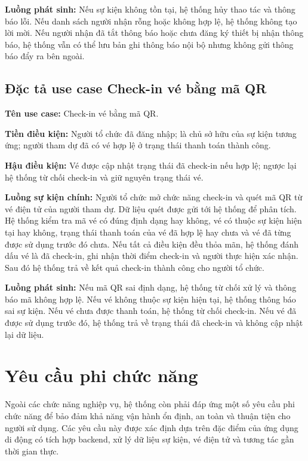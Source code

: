 \documentclass[../DoAn.tex]{subfiles}
\begin{document}
\textbf{Luồng phát sinh:}
Nếu sự kiện không tồn tại, hệ thống hủy thao tác và thông báo lỗi. Nếu danh sách người nhận rỗng hoặc không hợp lệ, hệ thống không tạo lời mời. Nếu người nhận đã tắt thông báo hoặc chưa đăng ký thiết bị nhận thông báo, hệ thống vẫn có thể lưu bản ghi thông báo nội bộ nhưng không gửi thông báo đẩy ra bên ngoài.

\subsection{Đặc tả use case Check-in vé bằng mã QR}
\textbf{Tên use case:} Check-in vé bằng mã \gls{QR}.

\textbf{Tiền điều kiện:} Người tổ chức đã đăng nhập; là chủ sở hữu của sự kiện tương ứng; người tham dự đã có vé hợp lệ ở trạng thái thanh toán thành công.

\textbf{Hậu điều kiện:} Vé được cập nhật trạng thái đã check-in nếu hợp lệ; ngược lại hệ thống từ chối check-in và giữ nguyên trạng thái vé.

\textbf{Luồng sự kiện chính:}
Người tổ chức mở chức năng check-in và quét mã \gls{QR} từ vé điện tử của người tham dự. Dữ liệu quét được gửi tới hệ thống để phân tích. Hệ thống kiểm tra mã vé có đúng định dạng hay không, vé có thuộc sự kiện hiện tại hay không, trạng thái thanh toán của vé đã hợp lệ hay chưa và vé đã từng được sử dụng trước đó chưa. Nếu tất cả điều kiện đều thỏa mãn, hệ thống đánh dấu vé là đã check-in, ghi nhận thời điểm check-in và người thực hiện xác nhận. Sau đó hệ thống trả về kết quả check-in thành công cho người tổ chức.

\textbf{Luồng phát sinh:}
Nếu mã \gls{QR} sai định dạng, hệ thống từ chối xử lý và thông báo mã không hợp lệ. Nếu vé không thuộc sự kiện hiện tại, hệ thống thông báo sai sự kiện. Nếu vé chưa được thanh toán, hệ thống từ chối check-in. Nếu vé đã được sử dụng trước đó, hệ thống trả về trạng thái đã check-in và không cập nhật lại dữ liệu.

\section{Yêu cầu phi chức năng}
\label{section:2.4}
Ngoài các chức năng nghiệp vụ, hệ thống còn phải đáp ứng một số yêu cầu phi chức năng để bảo đảm khả năng vận hành ổn định, an toàn và thuận tiện cho người sử dụng. Các yêu cầu này được xác định dựa trên đặc điểm của ứng dụng di động có tích hợp backend, xử lý dữ liệu sự kiện, vé điện tử và tương tác gần thời gian thực.
\end{document}

